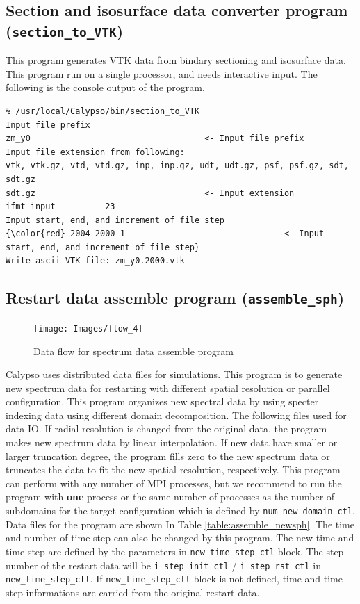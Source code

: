 \subsection{Section and isosurface data converter program ({\tt section\_to\_VTK})} 
\label{section:section_to_VTK}
This program generates VTK data from bindary sectioning and isosurface data. This program run on a single processor, and needs interactive input. The following is the console output of the program.

{\small
\begin{verbatim}
% /usr/local/Calypso/bin/section_to_VTK
Input file prefix
zm_y0									<- Input file prefix
Input file extension from following:
vtk, vtk.gz, vtd, vtd.gz, inp, inp.gz, udt, udt.gz, psf, psf.gz, sdt, sdt.gz  
sdt.gz									<- Input extension
ifmt_input          23
Input start, end, and increment of file step
{\color{red} 2004 2000 1								<- Input start, end, and increment of file step} 
Write ascii VTK file: zm_y0.2000.vtk
\end{verbatim}
}

\subsection{Restart data assemble program ({\tt assemble\_sph})}
\label{section:assemble_sph}
%
\begin{figure}[htbp]
\begin{center}
\texttt{[image: Images/flow\_4]}
\end{center}
\caption{Data flow for spectrum data assemble program}
\label{fig:flow_4}
\end{figure}
%
Calypso uses distributed data files for simulations. This program is to generate new spectrum data for restarting with different spatial resolution or parallel configuration. This program organizes new spectral data by using specter indexing data using different domain decomposition. The following files used for data IO. If radial resolution is changed from the original data, the program makes new spectrum data by linear interpolation. If new data have smaller or larger truncation degree, the program fills zero to the new spectrum data or truncates the data to fit the new spatial resolution, respectively. This program can perform with any number of MPI processes, but we recommend to run the program with {\bf one} process or the same number of processes as the number of subdomains for the target configuration which is defined by \verb|num_new_domain_ctl|. Data files for the program are shown In Table \ref{table:assemble_newsph}. The time and number of time step can also be changed by this program. The new time and time step are defined by the parameters in \verb|new_time_step_ctl| block. The step number of the restart data will be \verb|i_step_init_ctl| / \verb|i_step_rst_ctl| in  \verb|new_time_step_ctl|. If \verb|new_time_step_ctl| block is not defined, time and time step informations are carried from the original restart data.

